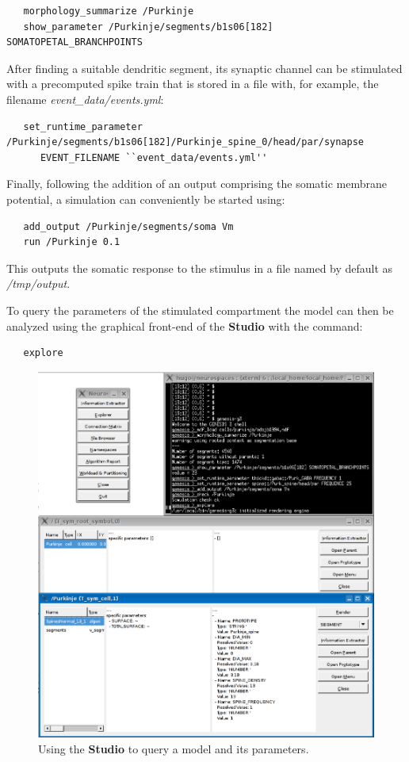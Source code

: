 \documentclass[12pt]{article}
\begin{document}
{\footnotesize
\begin{verbatim}
   morphology_summarize /Purkinje
   show_parameter /Purkinje/segments/b1s06[182] SOMATOPETAL_BRANCHPOINTS
\end{verbatim}
}

After finding a suitable dendritic segment, its synaptic channel can
be stimulated with a precomputed spike train that is stored in a file
with, for example, the filename {\it event\_data/events.yml}:

{\footnotesize
\begin{verbatim}
   set_runtime_parameter /Purkinje/segments/b1s06[182]/Purkinje_spine_0/head/par/synapse
      EVENT_FILENAME ``event_data/events.yml''
\end{verbatim}
}

Finally, following the addition of an output comprising the somatic membrane potential, a simulation can conveniently be started using:

{\footnotesize
\begin{verbatim}
   add_output /Purkinje/segments/soma Vm
   run /Purkinje 0.1
\end{verbatim}
}

This outputs the somatic response to the stimulus in a file named by default as {\it /tmp/output}.

To query the parameters of the stimulated compartment the model can
then be analyzed using the graphical front-end of the {\bf Studio}
with the command:

{\footnotesize
\begin{verbatim}
   explore
\end{verbatim}
}

\begin{figure}[ht]
  \centering
  \includegraphics[scale=0.3]{figures/studio-screenshot.eps}
  \caption{Using the {\bf Studio} to query a model and its
    parameters.}
  \label{fig:cbi-studio}
\end{figure}
\end{document}
